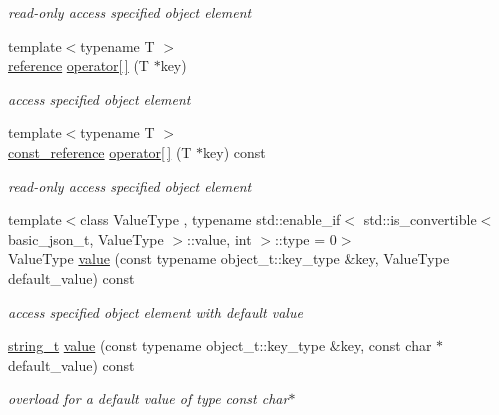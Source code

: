\begin{DoxyCompactItemize}
\begin{DoxyCompactList}\small\item\em read-\/only access specified object element \end{DoxyCompactList}\item 
{\footnotesize template$<$typename T $>$ }\\\mbox{\hyperlink{classnlohmann_1_1basic__json_ac6a5eddd156c776ac75ff54cfe54a5bc}{reference}} \mbox{\hyperlink{classnlohmann_1_1basic__json_abb8eaa633584b5aff9c8fcd242f25ca8}{operator\mbox{[}$\,$\mbox{]}}} (T $\ast$key)
\begin{DoxyCompactList}\small\item\em access specified object element \end{DoxyCompactList}\item 
{\footnotesize template$<$typename T $>$ }\\\mbox{\hyperlink{classnlohmann_1_1basic__json_a4057c5425f4faacfe39a8046871786ca}{const\+\_\+reference}} \mbox{\hyperlink{classnlohmann_1_1basic__json_a26554213cbb1722accc460ce348c860a}{operator\mbox{[}$\,$\mbox{]}}} (T $\ast$key) const
\begin{DoxyCompactList}\small\item\em read-\/only access specified object element \end{DoxyCompactList}\item 
{\footnotesize template$<$class Value\+Type , typename std\+::enable\+\_\+if$<$ std\+::is\+\_\+convertible$<$ basic\+\_\+json\+\_\+t, Value\+Type $>$\+::value, int $>$\+::type  = 0$>$ }\\Value\+Type \mbox{\hyperlink{classnlohmann_1_1basic__json_af9c51328fbe1da75eca750be3009917a}{value}} (const typename object\+\_\+t\+::key\+\_\+type \&key, Value\+Type default\+\_\+value) const
\begin{DoxyCompactList}\small\item\em access specified object element with default value \end{DoxyCompactList}\item 
\mbox{\hyperlink{classnlohmann_1_1basic__json_a61f8566a1a85a424c7266fb531dca005}{string\+\_\+t}} \mbox{\hyperlink{classnlohmann_1_1basic__json_ad6a18403e7fbac9c4efd06facc71fc88}{value}} (const typename object\+\_\+t\+::key\+\_\+type \&key, const char $\ast$default\+\_\+value) const
\begin{DoxyCompactList}\small\item\em overload for a default value of type const char$\ast$ \end{DoxyCompactList}\item 

\end{DoxyCompactItemize}
